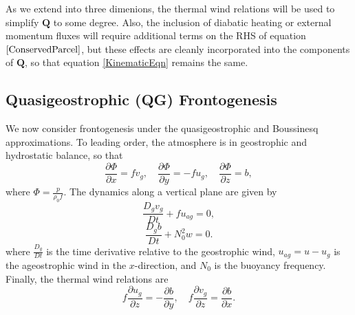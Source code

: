 \documentclass[11pt,onecolumn,oneside]{article}
\newcommand{\pdiff}[2]{\frac{\partial #1}{\partial #2}}
\begin{document}
As we extend into three dimenions, the thermal wind relations will be used to simplify $\mathbf{Q}$ to some degree. Also, the inclusion of diabatic heating or external momentum fluxes will require additional terms on the RHS of equation $\eqref{ConservedParcel}$, but these effects are cleanly incorporated into the components of $\mathbf{Q}$, so that equation \eqref{KinematicEqn} remains the same.


\subsection{Quasigeostrophic (QG) Frontogenesis}

We now consider frontogenesis under the quasigeostrophic and Boussinesq approximations. To leading order, the atmosphere is in geostrophic and hydrostatic balance, so that
\[
\pdiff{\Phi}{x} = f v_g, \quad \pdiff{\Phi}{y} = -f u_g, \quad \pdiff{\Phi}{z} = b,
\]
where $\Phi = \frac{p}{\rho_0 f}$. The dynamics along a vertical plane are given by
\begin{equation}\label{QG:Momentum}
\frac{D_g v_g}{Dt} + f u_{ag} = 0,
\end{equation}
\begin{equation}\label{QG:Buoyancy}
\frac{D_g b}{Dt} + N_0^2 w = 0.
\end{equation}
where $\frac{D_g}{Dt}$ is the time derivative relative to the geostrophic wind, $u_{ag} = u - u_g$ is the ageostrophic wind in the $x$-direction, and $N_0$ is the buoyancy frequency. Finally, the thermal wind relations are
\[
f \pdiff{u_g}{z} = - \pdiff{b}{y}, \quad f \pdiff{v_g}{z} = \pdiff{b}{x}.
\]
\end{document}
